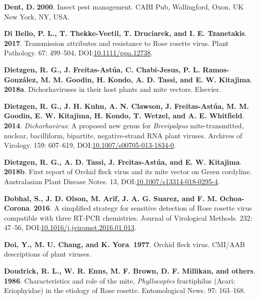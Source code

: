 \documentclass[12pt,final,CPage]{ufthesis}
\newlength{\cslhangindent}
\newenvironment{CSLReferences}[2] %
{%
	\setlength{\parindent}{0pt}
	\ifodd #1 \everypar{\setlength{\hangindent}{\cslhangindent}}\ignorespaces\fi
	\ifnum #2 > 0
	\setlength{\parskip}{#2\baselineskip}
	\fi
}%
{}
\begin{document}
{\begin{CSLReferences}{1}{0}
  \leavevmode{}%
  \textbf{Dent, D.} \textbf{2000}. Insect pest management. CABI Pub, Wallingford, Oxon, UK New York, NY, USA.

  \leavevmode{}%
  \textbf{Di Bello, P. L., T. Thekke-Veetil, T. Druciarek, and I. E. Tzanetakis}. \textbf{2017}. Transmission attributes and resistance to {Rose rosette virus}. Plant Pathology. 67: 499--504, DOI:\href{https://doi.org/10.1111/ppa.12738}{10.1111/ppa.12738}.

  \leavevmode{}%
  \textbf{Dietzgen, R. G., J. Freitas-Astúa, C. Chabi-Jesus, P. L. Ramos-González, M. M. Goodin, H. Kondo, A. D. Tassi, and E. W. Kitajima}. \textbf{2018a}. Dichorhaviruses in their host plants and mite vectors. Elsevier.

  \leavevmode{}%
  \textbf{Dietzgen, R. G., J. H. Kuhn, A. N. Clawson, J. Freitas-Astúa, M. M. Goodin, E. W. Kitajima, H. Kondo, T. Wetzel, and A. E. Whitfield}. \textbf{2014}. {\emph{Dichorhavirus}}: A proposed new genus for {\emph{Brevipalpus}} mite-transmitted, nuclear, bacilliform, bipartite, negative-strand {RNA} plant viruses. Archives of Virology. 159: 607--619, DOI:\href{https://doi.org/10.1007/s00705-013-1834-0}{10.1007/s00705-013-1834-0}.

  \leavevmode{}%
  \textbf{Dietzgen, R. G., A. D. Tassi, J. Freitas-Astúa, and E. W. Kitajima}. \textbf{2018b}. First report of {Orchid fleck virus} and its mite vector on {Green cordyline}. Australasian Plant Disease Notes. 13, DOI:\href{https://doi.org/10.1007/s13314-018-0295-4}{10.1007/s13314-018-0295-4}.

  \leavevmode{}%
  \textbf{Dobhal, S., J. D. Olson, M. Arif, J. A. G. Suarez, and F. M. Ochoa-Corona}. \textbf{2016}. A simplified strategy for sensitive detection of {Rose rosette virus} compatible with three {RT}-{PCR} chemistries. Journal of Virological Methods. 232: 47--56, DOI:\href{https://doi.org/10.1016/j.jviromet.2016.01.013}{10.1016/j.jviromet.2016.01.013}.

  \leavevmode{}%
  \textbf{Doi, Y., M. U. Chang, and K. Yora}. \textbf{1977}. Orchid fleck virus. {CMI/AAB} descriptions of plant viruses.

  \leavevmode{}%
  \textbf{Doudrick, R. L., W. R. Enns, M. F. Brown, D. F. Millikan, and others}. \textbf{1986}. Characteristics and role of the mite, {\emph{Phyllocoptes} fructiphilus} ({Acari}: {Eriophyidae}) in the etiology of {Rose rosette}. Entomological News. 97: 163--168.


\end{CSLReferences}}
\end{document}
